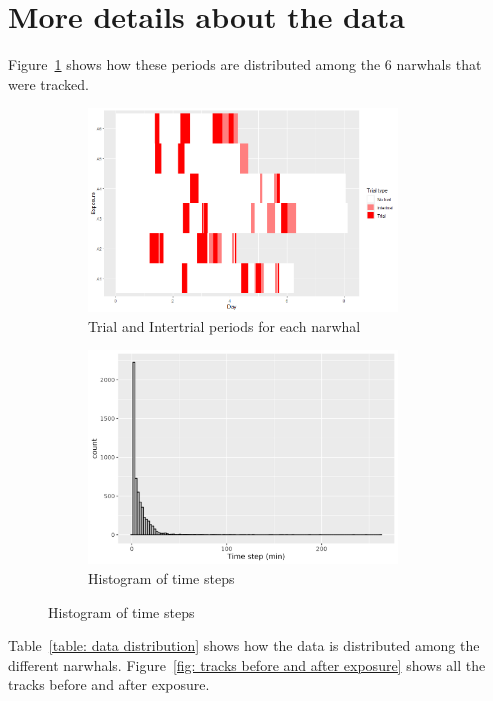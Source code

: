 \documentclass[11pt]{article}
\newcommand {\1}{\mathbb{1}}
\begin{document}
\newpage

\printbibliography

\newpage 

\appendix

\section{More details about the data}

Figure~\ref{fig: trials and intertrials distributions} shows how these periods are distributed among the $6$ narwhals that were tracked.

	\begin{figure}[H]
		\centering
		\begin{subfigure}{0.49\textwidth}
			\centering
			\includegraphics[width=0.9\textwidth]{images/data_exploration/trials.png}
			\caption{Trial and Intertrial periods for each narwhal}
			\label{fig: trials and intertrials distributions}
		\end{subfigure}
		\begin{subfigure}{0.49\textwidth}
			\centering
			\includegraphics[width=0.9\textwidth]{images/data_exploration/all_time_steps_histo}
			\caption{Histogram of time steps}
			\label{fig:alltimestepshisto}
		\end{subfigure}
	\end{figure}
 Table~\ref{table: data distribution}  shows how the data is distributed among the different narwhals. Figure~\ref{fig: tracks before and after exposure} shows all the tracks before and after exposure.
\end{document}

